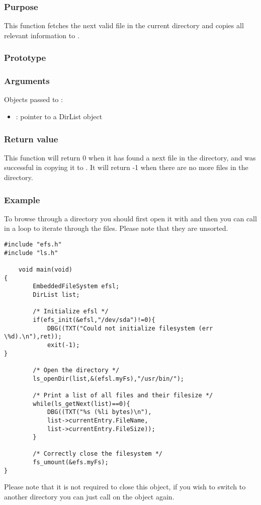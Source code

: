 \subsubsection*{Purpose}
This function fetches the next valid file in the current directory and copies
all relevant information to .
\subsubsection*{Prototype}
\subsubsection*{Arguments}
Objects passed to :
\begin{itemize}
	\item{: pointer to a DirList object}
\end{itemize}
\subsubsection*{Return value}
This function will return 0 when it has found a next file in the directory, and
was successful in copying it to . It will return -1
when there are no more files in the directory.

\subsubsection*{Example}
To browse through a directory you should first open it with  and
then you can call  in a loop to iterate through the files. Please
note that they are unsorted.
\lstset{numbers=left, stepnumber=1, numberstyle=\small, numbersep=5pt, tabsize=4}
\begin{lstlisting}
#include "efs.h"
#include "ls.h"

	void main(void)
{
		EmbeddedFileSystem efsl;
		DirList list;

		/* Initialize efsl */
		if(efs_init(&efsl,"/dev/sda")!=0){
			DBG((TXT("Could not initialize filesystem (err \%d).\n"),ret));
			exit(-1);
}
		
		/* Open the directory */
		ls_openDir(list,&(efsl.myFs),"/usr/bin/");
		
		/* Print a list of all files and their filesize */
		while(ls_getNext(list)==0){
			DBG((TXT("%s (%li bytes)\n"),
			list->currentEntry.FileName,
			list->currentEntry.FileSize));
		}

		/* Correctly close the filesystem */
		fs_umount(&efs.myFs);
}
\end{lstlisting}

Please note that it is not required to close this object, if you wish to switch
to another directory you can just call  on the object again.
